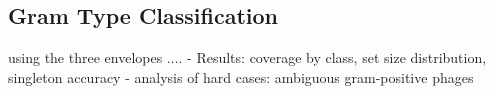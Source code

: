 \subsection{Gram Type Classification}
\noindent using the three envelopes ....
- Results: coverage by class, set size distribution, singleton accuracy
- analysis of hard cases: ambiguous gram-positive phages
